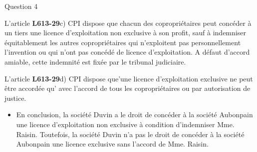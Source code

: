\begin{frame}{Question 4}

\begin{block}{}
L'article \textbf{L613-29}c) CPI dispose que chacun des copropriétaires 
peut concéder à un tiers une licence d'exploitation non exclusive à son profit,
 sauf à indemniser équitablement les autres copropriétaires 
 qui n'exploitent pas personnellement l'invention ou 
 qui n'ont pas concédé de licence d'exploitation.
  A défaut d'accord amiable,
cette indemnité est fixée par le tribunal judiciaire.
\end{block}

\begin{block}{}
L'article \textbf{L613-29}d) CPI dispose que'une 
licence d'exploitation exclusive 
ne peut être accordée qu'
avec l'accord de tous les copropriétaires ou par autorisation de justice. 
\end{block}

\begin{itemize}
    \item En conclusion, la société Duvin a le droit de concéder à 
    la société Aubonpain
     une licence d'exploitation non exclusive à condition d'indemniser
    Mme. Raisin. Toutefois, la société Duvin n'a pas le droit de concéder
    à la société Aubonpain une licence exclusive sans l'accord de Mme. Raisin.
\end{itemize}

\end{frame}